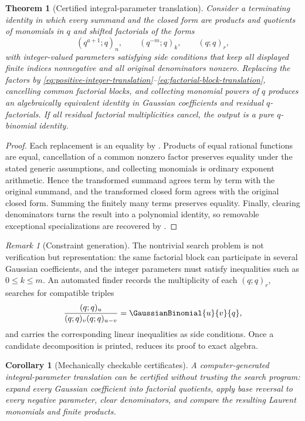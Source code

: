 \documentclass[11pt,a4paper,oneside,openany]{book}
\newtheorem{theorem}{Theorem}[chapter]
\newtheorem{corollary}[corollary]{Corollary}
\theoremstyle{definition}
\theoremstyle{remark}
\newtheorem{remark}[remark]{Remark}
\begin{document}
\begin{theorem}[Certified integral-parameter translation]\label{thm:certified-integral-translation}
Consider a terminating identity in which every summand and the closed form are products and quotients of monomials in $q$ and shifted factorials of the forms
\[
 (q^{a+1};q)_n,
 \qquad
 (q^{-m};q)_k,
 \qquad
 (q;q)_r,
\]
with integer-valued parameters satisfying side conditions that keep all displayed finite indices nonnegative and all original denominators nonzero.  Replacing the factors by \eqref{eq:positive-integer-translation}--\eqref{eq:factorial-block-translation}, cancelling common factorial blocks, and collecting monomial powers of $q$ produces an algebraically equivalent identity in Gaussian coefficients and residual $q$-factorials.  If all residual factorial multiplicities cancel, the output is a pure $q$-binomial identity.
\end{theorem}

\begin{proof}
Each replacement is an equality by .  Products of equal rational functions are equal, cancellation of a common nonzero factor preserves equality under the stated generic assumptions, and collecting monomials is ordinary exponent arithmetic.  Hence the transformed summand agrees term by term with the original summand, and the transformed closed form agrees with the original closed form.  Summing the finitely many terms preserves equality.  Finally, clearing denominators turns the result into a polynomial identity, so removable exceptional specializations are recovered by .
\end{proof}

\begin{remark}[Constraint generation]
The nontrivial search problem is not verification but representation: the same factorial block can participate in several Gaussian coefficients, and the integer parameters must satisfy inequalities such as $0\le k\le m$.  An automated finder records the multiplicity of each $(q;q)_r$, searches for compatible triples
\[
 \frac{(q;q)_u}{(q;q)_v(q;q)_{u-v}}
 =\GaussianBinomial{u}{v}{q},
\]
and carries the corresponding linear inequalities as side conditions.  Once a candidate decomposition is printed,  reduces its proof to exact algebra.
\end{remark}

\begin{corollary}[Mechanically checkable certificates]\label{cor:identity-finder-certificate}
A computer-generated integral-parameter translation can be certified without trusting the search program: expand every Gaussian coefficient into factorial quotients, apply base reversal to every negative parameter, clear denominators, and compare the resulting Laurent monomials and finite products.
\end{corollary}
\end{document}
